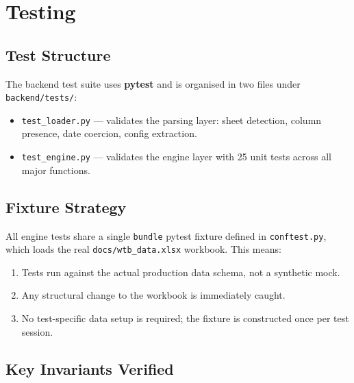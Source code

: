 \documentclass[12pt,a4paper]{report}
\begin{document}
\chapter{Testing}

\section{Test Structure}

The backend test suite uses \textbf{pytest} and is organised in two
files under \texttt{backend/tests/}:

\begin{itemize}
  \item \texttt{test\_loader.py} --- validates the parsing layer:
        sheet detection, column presence, date coercion, config extraction.
  \item \texttt{test\_engine.py} --- validates the engine layer with
        25 unit tests across all major functions.
\end{itemize}

\section{Fixture Strategy}

All engine tests share a single \texttt{bundle} pytest fixture defined
in \texttt{conftest.py}, which loads the real
\texttt{docs/wtb\_data.xlsx} workbook. This means:
\begin{enumerate}
  \item Tests run against the actual production data schema, not a
        synthetic mock.
  \item Any structural change to the workbook is immediately caught.
  \item No test-specific data setup is required; the fixture is
        constructed once per test session.
\end{enumerate}

\section{Key Invariants Verified}
\end{document}
